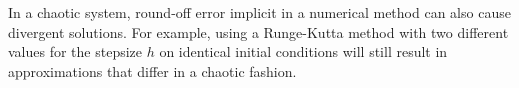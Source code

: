 In a chaotic system, round-off error implicit in a numerical method can also cause divergent solutions. For example, using a Runge-Kutta method with two different values for the stepsize $h$ on identical initial conditions will still result in approximations that differ in a chaotic fashion.

